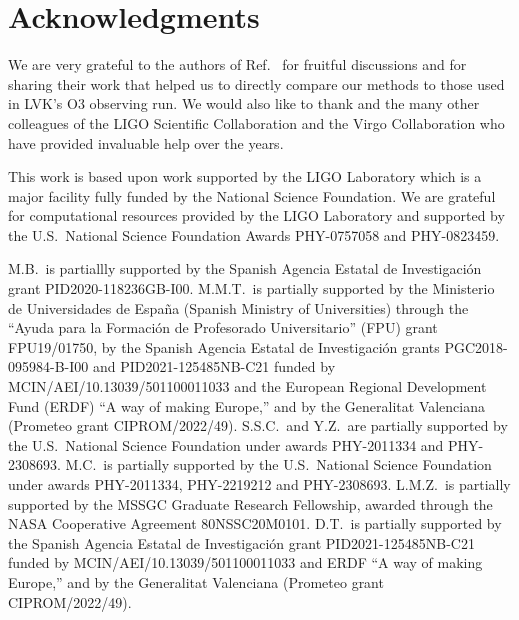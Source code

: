 \section*{Acknowledgments}

We are very grateful to the authors of Ref.~\cite{Chatterjee:2019avs} for fruitful discussions and for sharing their work that helped us to directly compare our methods to those used in
\ac{LVK}'s \ac{O3} observing run. We would also like to thank  and the many other colleagues of the LIGO Scientific Collaboration and the Virgo Collaboration who have provided invaluable help over
the years.

This work is based upon work supported by the LIGO Laboratory which is a major facility fully funded by the National Science Foundation. We are grateful for computational resources provided by
the LIGO Laboratory and supported by the U.S.\ National Science Foundation Awards PHY-0757058 and PHY-0823459. 

M.B.\ is partiallly supported by the Spanish Agencia Estatal de Investigaci\'on grant PID2020-118236GB-I00. M.M.T.\ is partially supported by the Ministerio de Universidades de Espa\~na (Spanish
Ministry of Universities) through the ``Ayuda para la Formaci\'on de Profesorado Universitario'' (FPU) grant FPU19/01750, by the Spanish Agencia Estatal de Investigaci\'on grants
PGC2018-095984-B-I00 and PID2021-125485NB-C21 funded by MCIN/AEI/10.13039/501100011033 and the European Regional Development Fund (ERDF) ``A way of making Europe,'' and by the Generalitat
Valenciana (Prometeo grant CIPROM/2022/49). S.S.C.\ and Y.Z.\ are partially supported by the U.S.\ National Science Foundation under awards PHY-2011334 and PHY-2308693. M.C.\ is partially
supported by the U.S.\ National Science Foundation under awards PHY-2011334, PHY-2219212 and PHY-2308693. L.M.Z.\ is partially supported by the MSSGC Graduate Research Fellowship, awarded
through the NASA Cooperative Agreement 80NSSC20M0101. D.T.~is partially supported by the Spanish Agencia Estatal de Investigaci\'on grant PID2021-125485NB-C21 funded by
MCIN/AEI/10.13039/501100011033 and ERDF ``A way of making Europe,'' and by the Generalitat Valenciana (Prometeo grant CIPROM/2022/49).


